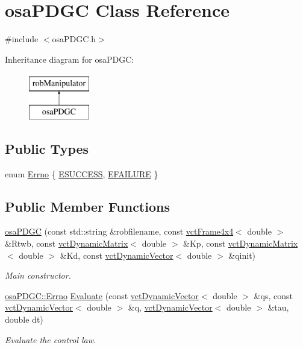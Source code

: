 \hypertarget{classosa_p_d_g_c}{\section{osa\-P\-D\-G\-C Class Reference}
\label{classosa_p_d_g_c}
}


{\ttfamily \#include $<$osa\-P\-D\-G\-C.\-h$>$}

Inheritance diagram for osa\-P\-D\-G\-C\-:\begin{figure}[H]
\begin{center}
\leavevmode
\includegraphics[height=2.000000cm]{db/de4/classosa_p_d_g_c}
\end{center}
\end{figure}
\subsection*{Public Types}
\begin{DoxyCompactItemize}
\item 
enum \hyperlink{classosa_p_d_g_c_af906659affdf9f98d957a4942b37f441}{Errno} \{ \hyperlink{classosa_p_d_g_c_af906659affdf9f98d957a4942b37f441a6226106dbd9609d76bc73d8b7fb68c8e}{E\-S\-U\-C\-C\-E\-S\-S}, 
\hyperlink{classosa_p_d_g_c_af906659affdf9f98d957a4942b37f441a03d04c1de6a736fdc57e5de8c4b4da67}{E\-F\-A\-I\-L\-U\-R\-E}
 \}
\end{DoxyCompactItemize}
\subsection*{Public Member Functions}
\begin{DoxyCompactItemize}
\item 
\hyperlink{classosa_p_d_g_c_a8b571b78f40d4c5e8a815f8a6f21a99d}{osa\-P\-D\-G\-C} (const std\-::string \&robfilename, const \hyperlink{classvct_frame4x4}{vct\-Frame4x4}$<$ double $>$ \&Rtwb, const \hyperlink{classvct_dynamic_matrix}{vct\-Dynamic\-Matrix}$<$ double $>$ \&Kp, const \hyperlink{classvct_dynamic_matrix}{vct\-Dynamic\-Matrix}$<$ double $>$ \&Kd, const \hyperlink{classvct_dynamic_vector}{vct\-Dynamic\-Vector}$<$ double $>$ \&qinit)
\begin{DoxyCompactList}\small\item\em Main constructor. \end{DoxyCompactList}\item 
\hyperlink{classosa_p_d_g_c_af906659affdf9f98d957a4942b37f441}{osa\-P\-D\-G\-C\-::\-Errno} \hyperlink{classosa_p_d_g_c_a24a126970a44fbb3123412361c071106}{Evaluate} (const \hyperlink{classvct_dynamic_vector}{vct\-Dynamic\-Vector}$<$ double $>$ \&qs, const \hyperlink{classvct_dynamic_vector}{vct\-Dynamic\-Vector}$<$ double $>$ \&q, \hyperlink{classvct_dynamic_vector}{vct\-Dynamic\-Vector}$<$ double $>$ \&tau, double dt)
\begin{DoxyCompactList}\small\item\em Evaluate the control law. \end{DoxyCompactList}\end{DoxyCompactItemize}
